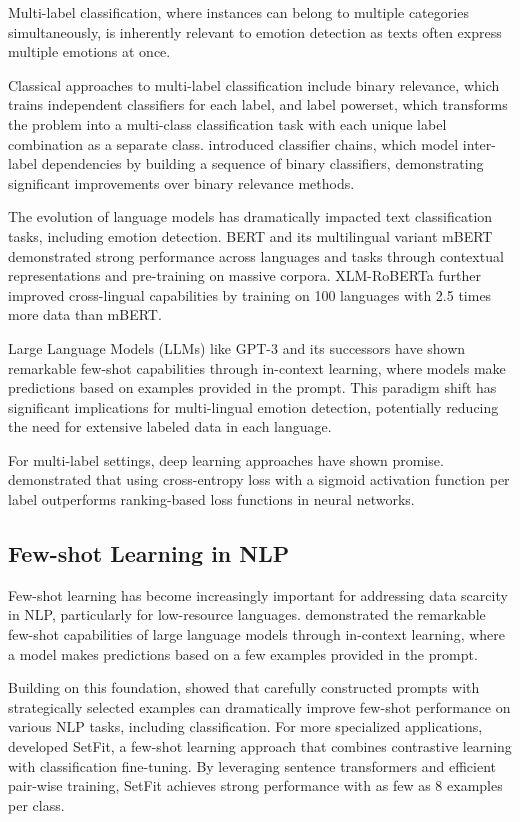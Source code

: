 \documentclass[a4paper,12pt]{extarticle}
\begin{document}
Multi-label classification, where instances can belong to multiple categories simultaneously, is inherently relevant to emotion detection as texts often express multiple emotions at once. 

Classical approaches to multi-label classification include binary relevance, which trains independent classifiers for each label, and label powerset, which transforms the problem into a multi-class classification task with each unique label combination as a separate class. \cite{read2011classifier} introduced classifier chains, which model inter-label dependencies by building a sequence of binary classifiers, demonstrating significant improvements over binary relevance methods.

The evolution of language models has dramatically impacted text classification tasks, including emotion detection. BERT \cite{devlin2019bert} and its multilingual variant mBERT demonstrated strong performance across languages and tasks through contextual representations and pre-training on massive corpora. XLM-RoBERTa \cite{conneau2020unsupervised} further improved cross-lingual capabilities by training on 100 languages with 2.5 times more data than mBERT.

Large Language Models (LLMs) like GPT-3 \cite{brown2020language} and its successors have shown remarkable few-shot capabilities through in-context learning, where models make predictions based on examples provided in the prompt. This paradigm shift has significant implications for multi-lingual emotion detection, potentially reducing the need for extensive labeled data in each language.

For multi-label settings, deep learning approaches have shown promise. \cite{nam2014large} demonstrated that using cross-entropy loss with a sigmoid activation function per label outperforms ranking-based loss functions in neural networks. 

\subsection{Few-shot Learning in NLP}

Few-shot learning has become increasingly important for addressing data scarcity in NLP, particularly for low-resource languages. \cite{brown2020language} demonstrated the remarkable few-shot capabilities of large language models through in-context learning, where a model makes predictions based on a few examples provided in the prompt.

Building on this foundation, \cite{gao2021making} showed that carefully constructed prompts with strategically selected examples can dramatically improve few-shot performance on various NLP tasks, including classification. For more specialized applications, \cite{tunstall2022efficient} developed SetFit, a few-shot learning approach that combines contrastive learning with classification fine-tuning. By leveraging sentence transformers and efficient pair-wise training, SetFit achieves strong performance with as few as 8 examples per class.
\end{document}
